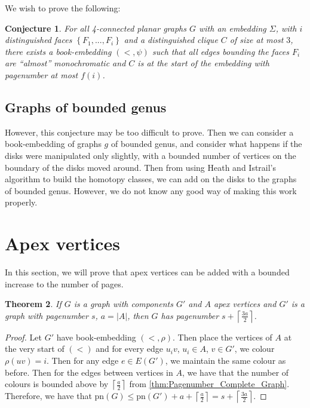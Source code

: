 \documentclass[]{report}
\newcommand{\pn}{\text{pn}}
\newtheorem{theorem}{Theorem}
\newtheorem{conjecture}[theorem]{Conjecture}
\theoremstyle{definition}
\numberwithin{theorem}{section}
\numberwithin{equation}{section}
\begin{document}
We wish to prove the following:

\begin{conjecture}\label{conj:4-planar graphs}
	For all 4-connected planar graphs $G$ with an embedding $\Sigma$, with $i$ distinguished faces $\left\lbrace F_1, ..., F_i \right\rbrace$ and a distinguished clique $C$ of size at most $3$, there exists a book-embedding $(<, \psi)$ such that all edges bounding the faces $F_i$ are ``almost'' monochromatic and $C$ is at the start of the embedding with pagenumber at most $f(i)$.
\end{conjecture}

\subsection{Graphs of bounded genus}

However, this conjecture may be too difficult to prove. Then we can consider a book-embedding of graphs $g$ of bounded genus, and consider what happens if the disks were manipulated only slightly, with a bounded number of vertices on the boundary of the disks moved around. Then from using Heath and Istrail's algorithm to build the homotopy classes, we can add on the disks to the graphs of bounded genus. However, we do not know any good way of making this work properly. 
\section{Apex vertices}
In this section, we will prove that apex vertices can be added with a bounded increase to the number of pages.
\begin{theorem}
	If $G$ is a graph with components $G'$ and $A$ apex vertices and $G'$ is a graph with pagenumber $s$, $a = |A|$, then $G$ has pagenumber $s + \left\lceil \frac{3a}{2}\right\rceil$. 
\end{theorem}
\begin{proof}
	Let $G'$ have book-embedding $(<, \rho)$. Then place the vertices of $A$ at the very start of $(<)$ and for every edge $u_iv$, $u_i \in A$, $v \in G'$, we colour $\rho(uv) = i$. Then for any edge $e \in E(G')$, we maintain the same colour as before. Then for the edges between vertices in $A$, we have that the number of colours is bounded above by $\left\lceil \frac{a}{2} \right\rceil$ from \cref{thm:Pagenumber_Complete_Graph}. Therefore, we have that $\pn(G) \leq \pn(G') + a + \left\lceil \frac{a}{2} \right\rceil =s + \left\lceil \frac{3a}{2}\right\rceil$. 
\end{proof}
\end{document}
